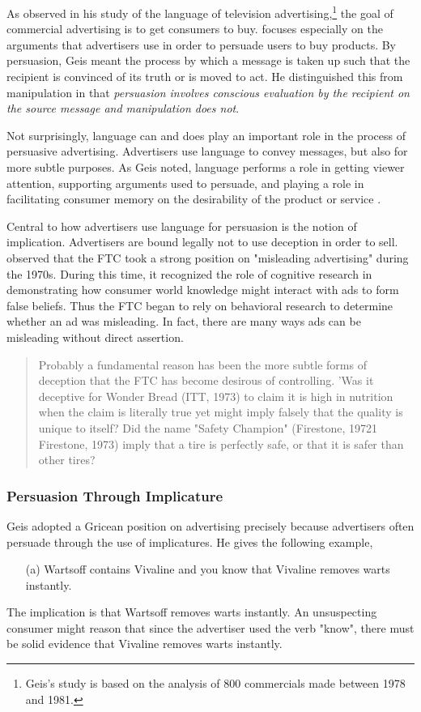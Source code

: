 As \cite{Geis:1982uf} observed in his study of the language of television advertising,\footnote{Geis's \citeyearpar{Geis:1982uf} study is based on the analysis of 800 commercials made between 1978 and 1981.} the goal of commercial advertising is to get consumers to buy. \cite{Geis:1982uf} focuses especially on the arguments that advertisers use in order to persuade users to buy products. By persuasion, Geis meant the process by which a message is taken up such that the recipient is convinced of its truth or is moved to act. He distinguished this from manipulation in that \textit{persuasion involves conscious evaluation by the recipient on the source message and manipulation does not}.

Not surprisingly, language can and does play an important role in the process of persuasive advertising. Advertisers use language to convey messages, but also for more subtle purposes. As Geis noted, language performs a role in getting viewer attention, supporting arguments used to persuade, and playing a role in facilitating consumer memory on the desirability of the product or service \cite[p. 23]{Geis:1982uf}.

Central to how advertisers use language for persuasion is the notion of implication. Advertisers are bound legally not to use deception in order to sell. \cite{Brandt:2013un} observed that the FTC took a strong position on "misleading advertising" during the 1970s. During this time, it recognized the role of cognitive research in demonstrating how consumer world knowledge might interact with ads to form false beliefs. Thus the FTC began to rely on behavioral research to determine whether an ad was misleading. In fact, there are many ways ads can be misleading without direct assertion. 

\begin{quote}
Probably a fundamental reason has been the more subtle forms of deception that the FTC has become desirous of controlling. 'Was it deceptive for Wonder Bread (ITT, 1973) to claim it is high in nutrition when the claim is literally true yet might imply falsely that the quality is unique to itself? Did the name "Safety Champion" (Firestone, 19721 Firestone, 1973) imply that a tire is perfectly safe, or that it is safer than other tires? \citep[p. 5]{Brandt:2013un}
\end{quote}

\subsubsection{Persuasion Through Implicature}
Geis adopted a Gricean position on advertising precisely because advertisers often persuade through the use of implicatures. He gives the following example,
\begin{itemize}
\item[(a)] Wartsoff contains Vivaline and you know that Vivaline removes warts instantly. \citep[p. 26]{Geis:1982uf}
\end{itemize}
The implication is that Wartsoff removes warts instantly. An unsuspecting consumer might reason that since the advertiser used the verb "know", there must be solid evidence that Vivaline removes warts instantly.

